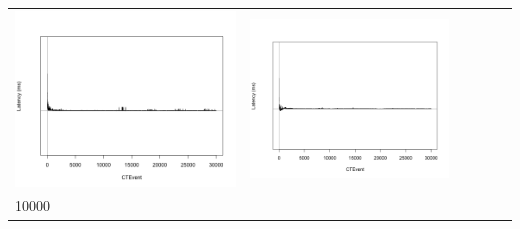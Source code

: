\begin{table}[htbp]
{\begin{tabular}{l | ccccc}
\begin{minipage}{.15\textwidth}
				\vspace{2pt}
     			 	\includegraphics[width=\linewidth]{images/lat-log-graph/N11}
    				 \end{minipage}
    			   &	 \begin{minipage}{.15\textwidth}
     			 	
				\vspace{2pt}
     			 	\includegraphics[width=\linewidth]{images/lat-log-graph/N13}
    				 \end{minipage}\\
		10000  &	 \begin{minipage}{.15\textwidth}
     			 	

\end{minipage}
\end{tabular}}
\end{table}
